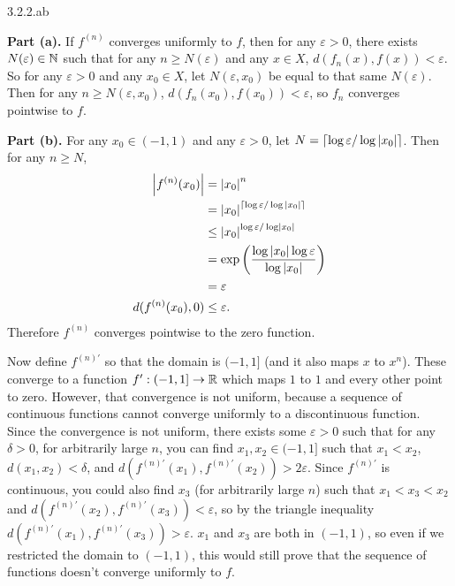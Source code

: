 \documentclass{article}
\begin{document}
\bigskip
\begin{prob}
    3.2.2.ab
\end{prob}
\textbf{Part (a).} If $f^{(n)}$ converges uniformly to $f$, then for any $\varepsilon > 0$, there exists $N(\varepsilon) \in \mathbb{N}$ such that for any $n \geq N(\varepsilon)$ and any $x \in X$, $d(f_n(x), f(x)) < \varepsilon$. So for any $\varepsilon > 0$ and any $x_0 \in X$, let $N(\varepsilon, x_0)$ be equal to that same $N(\varepsilon)$. Then for any $n \geq N(\varepsilon, x_0)$, $d(f_n(x_0), f(x_0)) < \varepsilon$, so $f_n$ converges pointwise to $f$.
\par
\textbf{Part (b).} For any $x_0 \in (-1, 1)$ and any $\varepsilon > 0$, let $N = \left\lceil \log{\varepsilon} / \log{\ensuremath{\left\lvert x_0 \right\rvert}} \right\rceil$. Then for any $n \geq N$,
\begin{align*}
\left\lvert f^{(n)}(x_0) \right\rvert &= \left\lvert x_0 \right\rvert^n \\
                   &= \left\lvert x_0 \right\rvert^{\left\lceil \log{\varepsilon} / \log{\ensuremath{\left\lvert x_0 \right\rvert}} \right\rceil} \\
                   &\leq \left\lvert x_0 \right\rvert^{\log \varepsilon / \log \left\lvert x_0 \right\rvert} \\
                   &= \exp \left( \frac{\log\left\lvert x_0 \right\rvert \log\varepsilon}{\log \left\lvert x_0 \right\rvert} \right) \\
                   &= \varepsilon \\
d(f^{(n)}(x_0), 0) &\leq \varepsilon.
\end{align*}
Therefore $f^{(n)}$ converges pointwise to the zero function.
\par
Now define $f^{(n)'}$ so that the domain is $(-1, 1]$ (and it also maps $x$ to $x^n$). These converge to a function $f': (-1, 1] \rightarrow \mathbb{R}$ which maps $1$ to $1$ and every other point to zero. However, that convergence is not uniform, because a sequence of continuous functions cannot converge uniformly to a discontinuous function. Since the convergence is not uniform, there exists some $\varepsilon > 0$ such that for any $\delta > 0$, for arbitrarily large $n$, you can find $x_1, x_2 \in (-1, 1]$ such that $x_1 < x_2$, $d(x_1, x_2) < \delta$, and $d(f^{(n)'}(x_1), f^{(n)'}(x_2)) > 2\varepsilon$. Since $f^{(n)'}$ is continuous, you could also find $x_3$ (for arbitrarily large $n$) such that $x_1 < x_3 < x_2$ and $d(f^{(n)'}(x_2), f^{(n)'}(x_3)) < \varepsilon$, so by the triangle inequality $d(f^{(n)'}(x_1), f^{(n)'}(x_3)) > \varepsilon$. $x_1$ and $x_3$ are both in $(-1, 1)$, so even if we restricted the domain to $(-1, 1)$, this would still prove that the sequence of functions doesn't converge uniformly to $f$.
\end{document}
